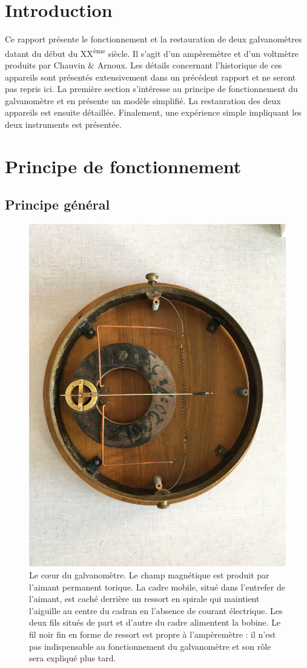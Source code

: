 \documentclass[12pt,a4paper,fleqn]{article}
\begin{document}

\newpage

\tableofcontents
\newpage



\section*{Introduction}

Ce rapport présente le fonctionnement et la restauration de deux galvanomètres datant du début du XX\textsuperscript{ème} siècle.
Il s'agit d'un ampèremètre et d'un voltmètre produits par Chauvin \& Arnoux.
Les détails concernant l'historique de ces appareils sont présentés extensivement dans un précédent rapport \cite{Ardellier2016} et ne seront pas repris ici.
La première section s'intéresse au principe de fonctionnement du galvanomètre et en présente un modèle simplifié.
La restauration des deux appareils est ensuite détaillée.
Finalement, une expérience simple impliquant les deux instruments est présentée.


\section{Principe de fonctionnement}

\subsection{Principe général}

\begin{figure}[htbp]
    \center
    \includegraphics[trim=1300 300 1300 800, clip, width=.5\linewidth]{images/IMG_4037.JPG}
    \caption{
    Le \og cœur \fg{} du galvanomètre.
    Le champ magnétique est produit par l'aimant permanent torique.
    La cadre mobile, situé dans l'entrefer de l'aimant, est caché derrière un ressort en spirale qui maintient l'aiguille au centre du cadran en l'absence de courant électrique.
    Les deux fils situés de part et d'autre du cadre alimentent la bobine.
    Le fil noir fin en forme de ressort est propre à l'ampèremètre : il n'est pas indispensable au fonctionnement du galvanomètre et son rôle sera expliqué plus tard.}
    \label{fig:principe}
\end{figure}
\end{document}
